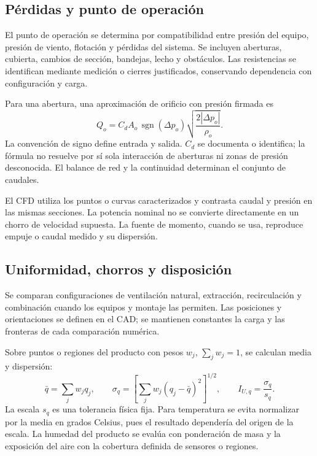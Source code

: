 \subsection{Pérdidas y punto de operación}

El punto de operación se determina por compatibilidad entre presión del equipo, presión de viento, flotación y pérdidas del sistema. Se incluyen aberturas, cubierta, cambios de sección, bandejas, lecho y obstáculos. Las resistencias se identifican mediante medición o cierres justificados, conservando dependencia con configuración y carga.

Para una abertura, una aproximación de orificio con presión firmada es
\begin{equation}
Q_o=C_dA_o\,\operatorname{sgn}(\Delta p_o)
\sqrt{\frac{2|\Delta p_o|}{\rho_o}}.
\label{met:abertura_presion}
\end{equation}
La convención de signo define entrada y salida. $C_d$ se documenta o identifica; la fórmula no resuelve por sí sola interacción de aberturas ni zonas de presión desconocida. El balance de red y la continuidad determinan el conjunto de caudales.

El CFD utiliza los puntos o curvas caracterizados y contrasta caudal y presión en las mismas secciones. La potencia nominal no se convierte directamente en un chorro de velocidad supuesta. La fuente de momento, cuando se usa, reproduce empuje o caudal medido y su dispersión.

\subsection{Uniformidad, chorros y disposición}
\label{met:uniformidad}

Se comparan configuraciones de ventilación natural, extracción, recirculación y combinación cuando los equipos y montaje las permiten. Las posiciones y orientaciones se definen en el CAD; se mantienen constantes la carga y las fronteras de cada comparación numérica.

Sobre puntos o regiones del producto con pesos $w_j$, $\sum_jw_j=1$, se calculan media y dispersión:
\begin{equation}
\bar q=\sum_jw_jq_j,\qquad
\sigma_q=\left[
\sum_jw_j(q_j-\bar q)^2
\right]^{1/2},
\qquad
I_{U,q}=\frac{\sigma_q}{s_q}.
\label{met:dispersion_espacial}
\end{equation}
La escala $s_q$ es una tolerancia física fija. Para temperatura se evita normalizar por la media en grados Celsius, pues el resultado dependería del origen de la escala. La humedad del producto se evalúa con ponderación de masa y la exposición del aire con la cobertura definida de sensores o regiones.

